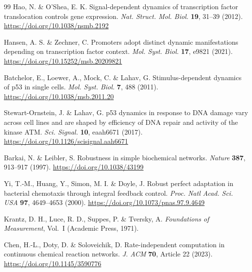 \documentclass[11pt,a4paper]{article}
\begin{document}
\begin{thebibliography}{99}
Hao, N. \& O'Shea, E. K. Signal-dependent dynamics of transcription factor translocation controls gene expression. \emph{Nat. Struct. Mol. Biol.} \textbf{19}, 31--39 (2012). \url{https://doi.org/10.1038/nsmb.2192}

Hansen, A. S. \& Zechner, C. Promoters adopt distinct dynamic manifestations depending on transcription factor context. \emph{Mol. Syst. Biol.} \textbf{17}, e9821 (2021). \url{https://doi.org/10.15252/msb.20209821}

Batchelor, E., Loewer, A., Mock, C. \& Lahav, G. Stimulus-dependent dynamics of p53 in single cells. \emph{Mol. Syst. Biol.} \textbf{7}, 488 (2011). \url{https://doi.org/10.1038/msb.2011.20}

Stewart-Ornstein, J. \& Lahav, G. p53 dynamics in response to DNA damage vary across cell lines and are shaped by efficiency of DNA repair and activity of the kinase ATM. \emph{Sci. Signal.} \textbf{10}, eaah6671 (2017). \url{https://doi.org/10.1126/scisignal.aah6671}

Barkai, N. \& Leibler, S. Robustness in simple biochemical networks. \emph{Nature} \textbf{387}, 913--917 (1997). \url{https://doi.org/10.1038/43199}

Yi, T.-M., Huang, Y., Simon, M. I. \& Doyle, J. Robust perfect adaptation in bacterial chemotaxis through integral feedback control. \emph{Proc. Natl Acad. Sci. USA} \textbf{97}, 4649--4653 (2000). \url{https://doi.org/10.1073/pnas.97.9.4649}

Krantz, D. H., Luce, R. D., Suppes, P. \& Tversky, A. \emph{Foundations of Measurement}, Vol.~I (Academic Press, 1971).

Chen, H.-L., Doty, D. \& Soloveichik, D. Rate-independent computation in continuous chemical reaction networks. \emph{J. ACM} \textbf{70}, Article 22 (2023). \url{https://doi.org/10.1145/3590776}

\end{thebibliography}
\end{document}
